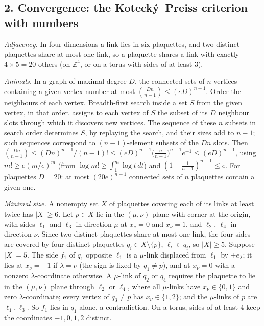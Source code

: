 \documentclass[11pt,a4paper]{article}
\begin{document}
\hypertarget{convergence-the-koteckuxfdpreiss-criterion-with-numbers}{%
\subsection{2. Convergence: the Kotecký--Preiss criterion with
numbers}\label{convergence-the-koteckuxfdpreiss-criterion-with-numbers}}

\emph{Adjacency.} In four dimensions a link lies in six plaquettes, and
two distinct plaquettes share at most one link, so a plaquette shares a
link with exactly \(4\times5=20\) others (on \(\mathbb Z^4\), or on a
torus with sides of at least \(3\)).

\emph{Animals.} In a graph of maximal degree \(D\), the connected sets
of \(n\) vertices containing a given vertex number at most
\(\binom{Dn}{n-1}\le(eD)^{n-1}\). Order the neighbours of each vertex.
Breadth-first search inside a set \(S\) from the given vertex, in that
order, assigns to each vertex of \(S\) the subset of its \(D\) neighbour
slots through which it discovers new vertices. The sequence of these
\(n\) subsets in search order determines \(S\), by replaying the search,
and their sizes add to \(n-1\); such sequences correspond to
\((n-1)\)-element subsets of the \(Dn\) slots. Then
\(\binom{Dn}{n-1}\le(Dn)^{n-1}/(n-1)!\le(eD)^{n-1}\big(\tfrac{n}{n-1}\big)^{n-1}e^{-1}\le(eD)^{n-1}\),
using \(m!\ge e(m/e)^m\) (from \(\log m!\ge\int_1^m\log t\,dt\)) and
\((1+\tfrac1{n-1})^{n-1}\le e\). For plaquettes \(D=20\): at most
\((20e)^{n-1}\) connected sets of \(n\) plaquettes contain a given one.

\emph{Minimal size.} A nonempty set \(X\) of plaquettes covering each of
its links at least twice has \(|X|\ge6\). Let \(p\in X\) lie in the
\((\mu,\nu)\) plane with corner at the origin, with sides \(\ell_1\) and
\(\ell_3\) in direction \(\mu\) at \(x_\nu=0\) and \(x_\nu=1\), and
\(\ell_2\), \(\ell_4\) in direction \(\nu\). Since two distinct
plaquettes share at most one link, the four sides are covered by four
distinct plaquettes \(q_i\in X\setminus\{p\}\), \(\ell_i\in q_i\), so
\(|X|\ge5\). Suppose \(|X|=5\). The side \(f_1\) of \(q_1\) opposite
\(\ell_1\) is a \(\mu\)-link displaced from \(\ell_1\) by
\(\pm e_\lambda\); it lies at \(x_\nu=-1\) if \(\lambda=\nu\) (the sign
is fixed by \(q_1\ne p\)), and at \(x_\nu=0\) with a nonzero
\(\lambda\)-coordinate otherwise. A \(\mu\)-link of \(q_2\) or \(q_4\)
requires the plaquette to lie in the \((\mu,\nu)\) plane through
\(\ell_2\) or \(\ell_4\), where all \(\mu\)-links have
\(x_\nu\in\{0,1\}\) and zero \(\lambda\)-coordinate; every vertex of
\(q_3\ne p\) has \(x_\nu\in\{1,2\}\); and the \(\mu\)-links of \(p\) are
\(\ell_1,\ell_3\). So \(f_1\) lies in \(q_1\) alone, a contradiction. On
a torus, sides of at least \(4\) keep the coordinates \(-1,0,1,2\)
distinct.
\end{document}

